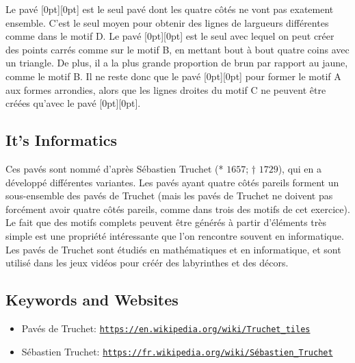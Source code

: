 \documentclass[a4paper,11pt]{report}
\newcommand{\BrochureUrlText}[1]{\texttt{#1}}
\newcommand{\taskGraphicsFolder}{..}
\begin{document}
Le pavé \raisebox{-0.5ex}[0pt][0pt]{} est le seul pavé dont les quatre côtés ne vont pas exatement ensemble. C’est le seul moyen pour obtenir des lignes de largueurs différentes comme dans le motif D.
Le pavé \raisebox{-0.5ex}[0pt][0pt]{} est le seul avec lequel on peut créer des points carrés comme sur le motif B, en mettant bout à bout quatre coins avec un triangle. De plus, il a la plus grande proportion de brun par rapport au jaune, comme le motif B.
Il ne reste donc que le pavé \raisebox{-0.5ex}[0pt][0pt]{} pour former le motif A aux formes arrondies, alors que les lignes droites du motif C ne peuvent être créées qu’avec le pavé \raisebox{-0.5ex}[0pt][0pt]{}.


\subsection*{It’s Informatics}

Ces pavés sont nommé d’après Sébastien Truchet (* $1657$; † $1729$), qui en a développé différentes variantes. Les pavés ayant quatre côtés pareils forment un sous-ensemble des pavés de Truchet (mais les pavés de Truchet ne doivent pas forcément avoir quatre côtés pareils, comme dans trois des motifs de cet exercice).
Le fait que des motifs complets peuvent être générés à partir d’éléments très simple est une propriété intéressante que l’on rencontre souvent en informatique. Les pavés de Truchet sont étudiés en mathématiques et en informatique, et sont utilisé dans les jeux vidéos pour créér des labyrinthes et des décors.

{\raggedright

\subsection*{Keywords and Websites}

\begin{itemize}
  \item Pavés de Truchet: \href{https://en.wikipedia.org/wiki/Truchet_tiles}{\BrochureUrlText{https://en.wikipedia.org/wiki/Truchet\_tiles}}
  \item Sébastien Truchet: \href{https://fr.wikipedia.org/wiki/S\%C3\%A9bastien_Truchet}{\BrochureUrlText{https://fr.wikipedia.org/wiki/Sébastien\_Truchet}}
\end{itemize}


}
\end{document}
